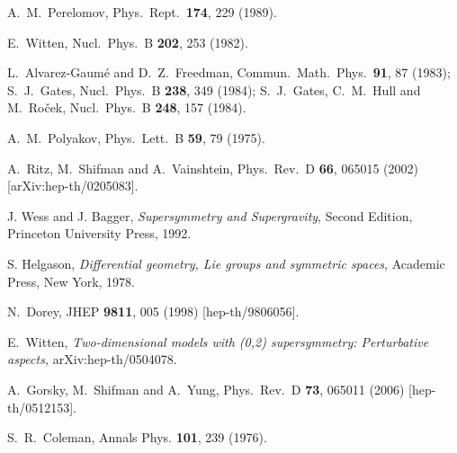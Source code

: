 \documentclass[epsfig,12pt]{article}
\newcommand{\cpn}{CP$(N-1)\,$}
\begin{document}
{\begin{thebibliography}{99}
 A.~M.~Perelomov,
  Phys.\ Rept.\  {\bf 174}, 229 (1989).
  
  E.~Witten,
  Nucl.\ Phys.\  B {\bf 202}, 253 (1982).
  
 L.~Alvarez-Gaum\'{e} and D.~Z.~Freedman,
Commun.\ Math.\ Phys.\  {\bf 91}, 87 (1983);
S.~J.~Gates,
Nucl.\ Phys.\ B {\bf 238}, 349 (1984);
S.~J.~Gates, C.~M.~Hull and M.~Ro\v{c}ek,
Nucl.\ Phys.\ B {\bf 248}, 157 (1984).

 A.~M.~Polyakov,
  Phys.\ Lett.\  B {\bf 59}, 79 (1975).
  
  A.~Ritz, M.~Shifman and A.~Vainshtein,
  Phys.\ Rev.\  D {\bf 66}, 065015 (2002)
  [arXiv:hep-th/0205083].
  
J. Wess and J. Bagger, {\em Supersymmetry and Supergravity}, Second Edition,
Princeton University Press, 1992.

S. Helgason, {\sl Differential geometry, Lie groups and symmetric spaces},
Academic Press, New York, 1978.
  
N.~Dorey,
JHEP {\bf 9811}, 005 (1998) [hep-th/9806056].

  E.~Witten,
{\em Two-dimensional models with (0,2) supersymmetry: Perturbative aspects,}
  arXiv:hep-th/0504078.
  
A.~Gorsky, M.~Shifman and A.~Yung,
Phys.\ Rev.\ D {\bf 73}, 065011 (2006)
[hep-th/0512153].

S.~R.~Coleman,
Annals Phys.  {\bf 101}, 239 (1976).


\end{thebibliography}}
\end{document}
